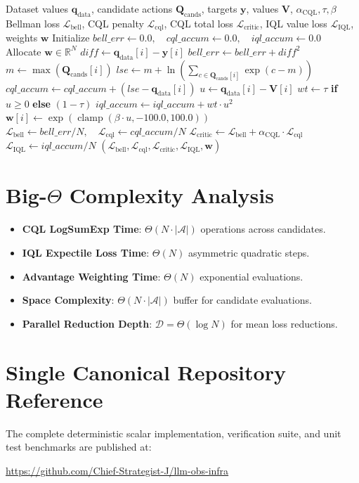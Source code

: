 \documentclass[11pt,a4paper]{article}
\theoremstyle{definition}
\begin{document}
\begin{algorithm}[H]
\caption{Offline RL Conservative and Expectile Evaluation}
\begin{algorithmic}[1]
\Require Dataset values $\mathbf{q}_{\text{data}}$, candidate actions $\mathbf{Q}_{\text{cands}}$, targets $\mathbf{y}$, values $\mathbf{V}$, $\alpha_{\text{CQL}}, \tau, \beta$
\Ensure Bellman loss $\mathcal{L}_{\text{bell}}$, CQL penalty $\mathcal{L}_{\text{cql}}$, CQL total loss $\mathcal{L}_{\text{critic}}$, IQL value loss $\mathcal{L}_{\text{IQL}}$, weights $\mathbf{w}$
\State Initialize $bell\_err \gets 0.0, \quad cql\_accum \gets 0.0, \quad iql\_accum \gets 0.0$
\State Allocate $\mathbf{w} \in \mathbb{R}^N$
    \State $diff \gets \mathbf{q}_{\text{data}}[i] - \mathbf{y}[i]$
    \State $bell\_err \gets bell\_err + diff^2$
    \State $m \gets \max(\mathbf{Q}_{\text{cands}}[i])$
    \State $lse \gets m + \ln\left( \sum_{c \in \mathbf{Q}_{\text{cands}}[i]} \exp(c - m) \right)$
    \State $cql\_accum \gets cql\_accum + (lse - \mathbf{q}_{\text{data}}[i])$
    \State $u \gets \mathbf{q}_{\text{data}}[i] - \mathbf{V}[i]$
    \State $wt \gets \tau$ \textbf{if} $u \ge 0$ \textbf{else} $(1 - \tau)$
    \State $iql\_accum \gets iql\_accum + wt \cdot u^2$
    \State $\mathbf{w}[i] \gets \exp(\operatorname{clamp}(\beta \cdot u, -100.0, 100.0))$
\EndFor
\State $\mathcal{L}_{\text{bell}} \gets bell\_err / N, \quad \mathcal{L}_{\text{cql}} \gets cql\_accum / N$
\State $\mathcal{L}_{\text{critic}} \gets \mathcal{L}_{\text{bell}} + \alpha_{\text{CQL}} \cdot \mathcal{L}_{\text{cql}}$
\State $\mathcal{L}_{\text{IQL}} \gets iql\_accum / N$
\State \Return $(\mathcal{L}_{\text{bell}}, \mathcal{L}_{\text{cql}}, \mathcal{L}_{\text{critic}}, \mathcal{L}_{\text{IQL}}, \mathbf{w})$
\end{algorithmic}
\end{algorithm}

\section{Big-$\Theta$ Complexity Analysis}

\begin{itemize}
    \item \textbf{CQL LogSumExp Time}: $\Theta(N \cdot |\mathcal{A}|)$ operations across candidates.
    \item \textbf{IQL Expectile Loss Time}: $\Theta(N)$ asymmetric quadratic steps.
    \item \textbf{Advantage Weighting Time}: $\Theta(N)$ exponential evaluations.
    \item \textbf{Space Complexity}: $\Theta(N \cdot |\mathcal{A}|)$ buffer for candidate evaluations.
    \item \textbf{Parallel Reduction Depth}: $\mathcal{D} = \Theta(\log N)$ for mean loss reductions.
\end{itemize}

\section{Single Canonical Repository Reference}

The complete deterministic scalar implementation, verification suite, and unit test benchmarks are published at:
\begin{center}
\url{https://github.com/Chief-Strategist-J/llm-obs-infra}
\end{center}
\end{document}
